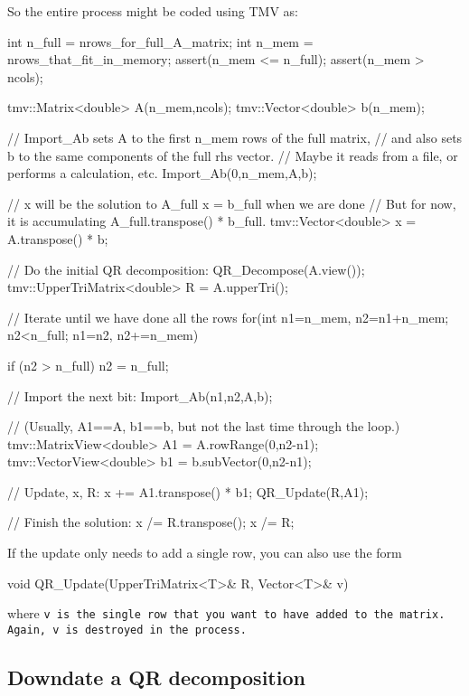 So the entire process might be coded using TMV as:
\begin{tmvcode}
int n_full = nrows_for_full_A_matrix;
int n_mem = nrows_that_fit_in_memory;
assert(n_mem <= n_full);
assert(n_mem > ncols);

tmv::Matrix<double> A(n_mem,ncols); 
tmv::Vector<double> b(n_mem);

// Import_Ab sets A to the first n_mem rows of the full matrix, 
// and also sets b to the same components of the full rhs vector.
// Maybe it reads from a file, or performs a calculation, etc.
Import_Ab(0,n_mem,A,b);

// x will be the solution to A_full x = b_full when we are done
// But for now, it is accumulating A_full.transpose() * b_full.
tmv::Vector<double> x = A.transpose() * b;

// Do the initial QR decomposition:
QR_Decompose(A.view());
tmv::UpperTriMatrix<double> R = A.upperTri();

// Iterate until we have done all the rows
for(int n1=n_mem, n2=n1+n_mem; n2<n_full; n1=n2, n2+=n_mem) {
    if (n2 > n_full) n2 = n_full;

    // Import the next bit:
    Import_Ab(n1,n2,A,b);

    // (Usually, A1==A, b1==b, but not the last time through the loop.)
    tmv::MatrixView<double> A1 = A.rowRange(0,n2-n1);
    tmv::VectorView<double> b1 = b.subVector(0,n2-n1);

    // Update, x, R:
    x += A1.transpose() * b1;
    QR_Update(R,A1);
}

// Finish the solution:
x /= R.transpose();
x /= R;
\end{tmvcode}

If the update only needs to add a single row, you can also use the form
\begin{tmvcode}
void QR_Update(UpperTriMatrix<T>& R, Vector<T>& v)
\end{tmvcode}
where \tt{v} is the single row that you want to have added to the matrix.  Again, \tt{v} is destroyed in the process.

\subsection{Downdate a QR decomposition}
\label{QRDowndate}

